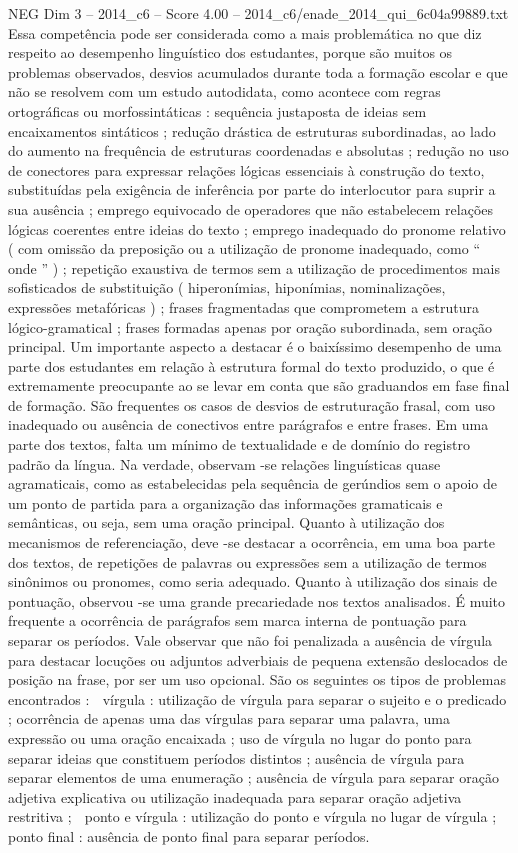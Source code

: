 \begin{textsample}{NEG Dim 3 – 2014\_c6 – Score 4.00 – 2014\_c6/enade\_2014\_qui\_6c04a99889.txt}
Essa competência pode ser considerada como a mais problemática no que diz respeito ao desempenho linguístico dos estudantes, porque são muitos os problemas observados, desvios acumulados durante toda a formação escolar e que não se resolvem com um estudo autodidata, como acontece com regras ortográficas ou morfossintáticas : sequência justaposta de ideias sem encaixamentos sintáticos ; redução drástica de estruturas subordinadas, ao lado do aumento na frequência de estruturas coordenadas e absolutas ; redução no uso de conectores para expressar relações lógicas essenciais à construção do texto, substituídas pela exigência de inferência por parte do interlocutor para suprir a sua ausência ; emprego equivocado de operadores que não estabelecem relações lógicas coerentes entre ideias do texto ; emprego inadequado do pronome relativo ( com omissão da preposição ou a utilização de pronome inadequado, como “ onde ” ) ; repetição exaustiva de termos sem a utilização de procedimentos mais sofisticados de substituição ( hiperonímias, hiponímias, nominalizações, expressões metafóricas ) ; frases fragmentadas que comprometem a estrutura lógico-gramatical ; frases formadas apenas por oração subordinada, sem oração principal.
Um importante aspecto a destacar é o baixíssimo desempenho de uma parte dos estudantes em relação à estrutura formal do texto produzido, o que é extremamente preocupante ao se levar em conta que são graduandos em fase final de formação.
São frequentes os casos de desvios de estruturação frasal, com uso inadequado ou ausência de conectivos entre parágrafos e entre frases.
Em uma parte dos textos, falta um mínimo de textualidade e de domínio do registro padrão da língua.
Na verdade, observam -se relações linguísticas quase agramaticais, como as estabelecidas pela sequência de gerúndios sem o apoio de um ponto de partida para a organização das informações gramaticais e semânticas, ou seja, sem uma oração principal.
Quanto à utilização dos mecanismos de referenciação, deve -se destacar a ocorrência, em uma boa parte dos textos, de repetições de palavras ou expressões sem a utilização de termos sinônimos ou pronomes, como seria adequado.
Quanto à utilização dos sinais de pontuação, observou -se uma grande precariedade nos textos analisados.
É muito frequente a ocorrência de parágrafos sem marca interna de pontuação para separar os períodos.
Vale observar que não foi penalizada a ausência de vírgula para destacar locuções ou adjuntos adverbiais de pequena extensão deslocados de posição na frase, por ser um uso opcional.
São os seguintes os tipos de problemas encontrados :  vírgula : utilização de vírgula para separar o sujeito e o predicado ; ocorrência de apenas uma das vírgulas para separar uma palavra, uma expressão ou uma oração encaixada ; uso de vírgula no lugar do ponto para separar ideias que constituem períodos distintos ; ausência de vírgula para separar elementos de uma enumeração ; ausência de vírgula para separar oração adjetiva explicativa ou utilização inadequada para separar oração adjetiva restritiva ;  ponto e vírgula : utilização do ponto e vírgula no lugar de vírgula ;  ponto final : ausência de ponto final para separar períodos.

\end{textsample}
